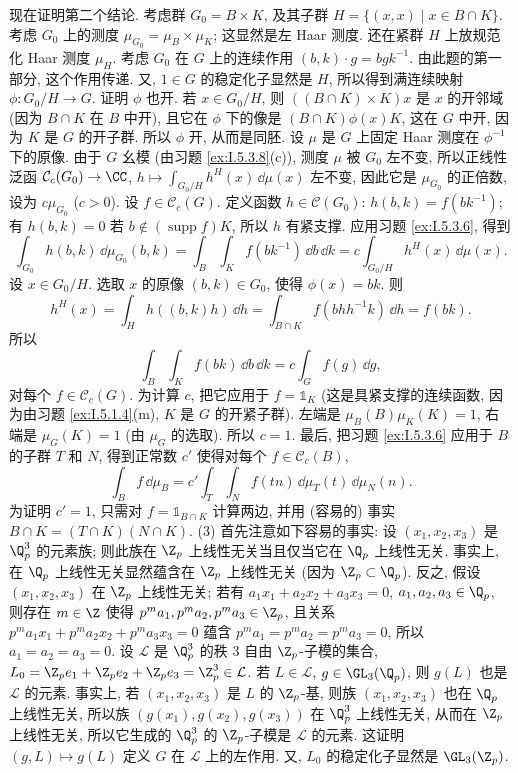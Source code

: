 \begin{solution}
现在证明第二个结论. 考虑群 $G_0 = B \times K$, 及其子群 $H = \{(x, x) \mid x \in B \cap K\}$. 考虑 $G_0$ 上的测度 $\mu_{G_0} = \mu_B \times \mu_K$; 这显然是左 Haar 测度. 还在紧群 $H$ 上放规范化 Haar 测度 $\mu_H$. 考虑 $G_0$ 在 $G$ 上的连续作用 $(b, k) \cdot g = bgk^{-1}$. 由此题的第一部分, 这个作用传递. 又, $1 \in G$ 的稳定化子显然是 $H$, 所以得到满连续映射 $\phi \colon G_0/H \to G$. 证明 $\phi$ 也开. 若 $x \in G_0/H$, 则 $((B \cap K) \times K)x$ 是 $x$ 的开邻域 (因为 $B \cap K$ 在 $B$ 中开), 且它在 $\phi$ 下的像是 $(B \cap K)\phi(x)K$, 这在 $G$ 中开, 因为 $K$ 是 $G$ 的开子群. 所以 $\phi$ 开, 从而是同胚. 设 $\mu$ 是 $G$ 上固定 Haar 测度在 $\phi^{-1}$ 下的原像. 由于 $G$ 幺模 (由习题 \ref{ex:I.5.3.8}(c)), 测度 $\mu$ 被 $G_0$ 左不变, 所以正线性泛函 $\mathcal{C}_c(G_0) \to \CC$, $h \longmapsto \int_{G_0/H}h^H(x)\,\dd\mu(x)$ 左不变, 因此它是 $\mu_{G_0}$ 的正倍数, 设为 $c\mu_{G_0}$ ($c > 0$). 设 $f \in \mathcal{C}_c(G)$. 定义函数 $h \in \mathcal{C}(G_0)$: $h(b, k) = f(bk^{-1})$; 有 $h(b, k) = 0$ 若 $b \notin (\operatorname{supp} f)K$, 所以 $h$ 有紧支撑. 应用习题 \ref{ex:I.5.3.6}, 得到
\[
\int_{G_0}h(b, k)\,\dd\mu_{G_0}(b, k) = \int_B\int_K f(bk^{-1})\,\dd b\,\dd k = c\int_{G_0/H}h^H(x)\,\dd\mu(x).
\]
设 $x \in G_0/H$. 选取 $x$ 的原像 $(b, k) \in G_0$, 使得 $\phi(x) = bk$. 则
\[
h^H(x) = \int_H h((b, k)h)\,\dd h = \int_{B \cap K}f(bhh^{-1}k)\,\dd h = f(bk).
\]
所以
\[
\int_B\int_K f(bk)\,\dd b\,\dd k = c\int_G f(g)\,\dd g,
\]
对每个 $f \in \mathcal{C}_c(G)$. 为计算 $c$, 把它应用于 $f = \mathbb{1}_K$ (这是具紧支撑的连续函数, 因为由习题 \ref{ex:I.5.1.4}(m), $K$ 是 $G$ 的开紧子群). 左端是 $\mu_B(B)\mu_K(K) = 1$, 右端是 $\mu_G(K) = 1$ (由 $\mu_G$ 的选取). 所以 $c = 1$.
最后, 把习题 \ref{ex:I.5.3.6} 应用于 $B$ 的子群 $T$ 和 $N$, 得到正常数 $c'$ 使得对每个 $f \in \mathcal{C}_c(B)$,
\[
\int_B f\,\dd\mu_B = c'\int_T\int_N f(tn)\,\dd\mu_T(t)\,\dd\mu_N(n).
\]
为证明 $c' = 1$, 只需对 $f = \mathbb{1}_{B \cap K}$ 计算两边, 并用 (容易的) 事实 $B \cap K = (T \cap K)(N \cap K)$.
(3) 首先注意如下容易的事实: 设 $(x_1, x_2, x_3)$ 是 $\Q_p^3$ 的元素族; 则此族在 $\Z_p$ 上线性无关当且仅当它在 $\Q_p$ 上线性无关. 事实上, 在 $\Q_p$ 上线性无关显然蕴含在 $\Z_p$ 上线性无关 (因为 $\Z_p \subset \Q_p$). 反之, 假设 $(x_1, x_2, x_3)$ 在 $\Z_p$ 上线性无关; 若有 $a_1x_1 + a_2x_2 + a_3x_3 = 0$, $a_1, a_2, a_3 \in \Q_p$, 则存在 $m \in \Z$ 使得 $p^ma_1, p^ma_2, p^ma_3 \in \Z_p$, 且关系 $p^ma_1x_1 + p^ma_2x_2 + p^ma_3x_3 = 0$ 蕴含 $p^ma_1 = p^ma_2 = p^ma_3 = 0$, 所以 $a_1 = a_2 = a_3 = 0$.
设 $\mathcal{L}$ 是 $\Q_p^3$ 的秩 $3$ 自由 $\Z_p$-子模的集合, $L_0 = \Z_pe_1 + \Z_pe_2 + \Z_pe_3 = \Z_p^3 \in \mathcal{L}$. 若 $L \in \mathcal{L}$, $g \in \GL_3(\Q_p)$, 则 $g(L)$ 也是 $\mathcal{L}$ 的元素. 事实上, 若 $(x_1, x_2, x_3)$ 是 $L$ 的 $\Z_p$-基, 则族 $(x_1, x_2, x_3)$ 也在 $\Q_p$ 上线性无关, 所以族 $(g(x_1), g(x_2), g(x_3))$ 在 $\Q_p^3$ 上线性无关, 从而在 $\Z_p$ 上线性无关, 所以它生成的 $\Q_p^3$ 的 $\Z_p$-子模是 $\mathcal{L}$ 的元素. 这证明 $(g, L) \longmapsto g(L)$ 定义 $G$ 在 $\mathcal{L}$ 上的左作用. 又, $L_0$ 的稳定化子显然是 $\GL_3(\Z_p)$.

\end{solution}
